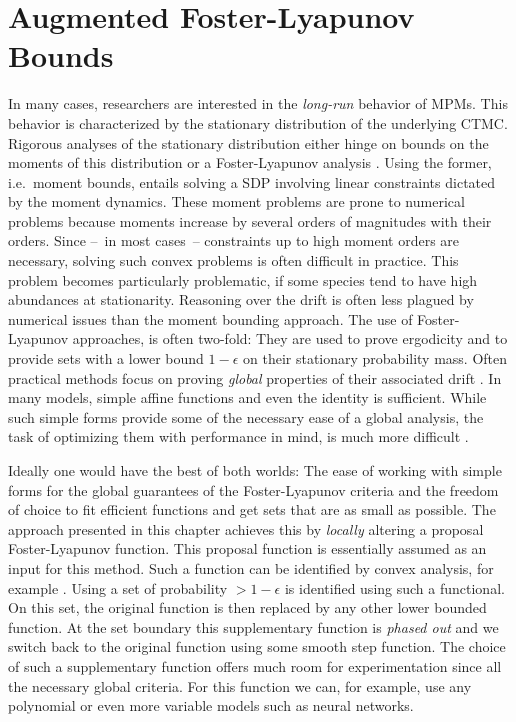 \chapter{Augmented Foster-Lyapunov Bounds}
In many cases, researchers are interested in the \emph{long-run} behavior of \acp{MPM}.
This behavior is characterized by the stationary distribution of the underlying \ac{CTMC}.
Rigorous analyses of the stationary distribution either hinge on bounds on the moments of this distribution or a Foster-Lyapunov analysis \parencite{kuntz2021stationary}.
Using the former, i.e.\ moment bounds, entails solving a \acl{SDP} involving linear constraints dictated by the moment dynamics.
These moment problems are prone to numerical problems because moments increase by several orders of magnitudes with their orders.
Since --~in most cases~-- constraints up to high moment orders are necessary, solving such convex problems is often difficult in practice.
This problem becomes particularly problematic, if some species tend to have high abundances at stationarity.
Reasoning over the drift is often less plagued by numerical issues than the moment bounding approach.
The use of Foster-Lyapunov approaches, is often two-fold: They are used to prove ergodicity and to provide sets with a lower bound $1-\epsilon$ on their stationary probability mass.
Often practical methods focus on proving \emph{global} properties of their associated drift \parencite{gupta2014scalable,spieler2014numerical}.
In many models, simple affine functions \parencite{gupta2017finite} and even the identity \parencite{spieler2014numerical} is sufficient.
While such simple forms provide some of the necessary ease of a global analysis, the task of optimizing them with performance in mind, is much more difficult \parencite{milias2014optimization}.

Ideally one would have the best of both worlds: The ease of working with simple forms for the global guarantees of the Foster-Lyapunov criteria and the freedom of choice to fit efficient functions and get sets that are as small as possible.
The approach presented in this chapter achieves this by \emph{locally} altering a proposal Foster-Lyapunov function.
This proposal function is essentially assumed as an input for this method.
Such a function can be identified by convex analysis, for example \parencite{gupta2014scalable}.
Using a set of probability $>1-\epsilon$ is identified using such a functional.
On this set, the original function is then replaced by any other lower bounded function.
At the set boundary this supplementary function is \emph{phased out} and we switch back to the original function using some smooth step function.
The choice of such a supplementary function offers much room for experimentation since all the necessary global criteria.
For this function we can, for example, use any polynomial or even more variable models such as neural networks.

